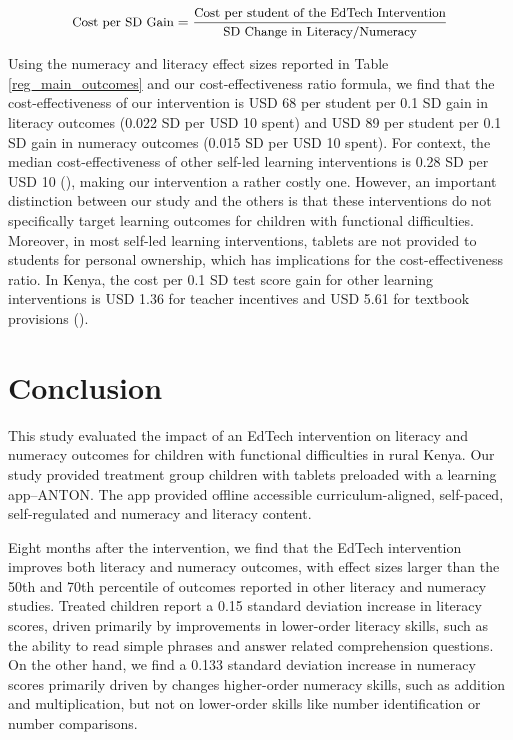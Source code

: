 \documentclass[hidelinks,12pt]{article}
\begin{document}
\begin{singlespace}
\[
\small\text{Cost per SD Gain} = \frac{\text{Cost per student of the EdTech Intervention}}{\text{SD Change in Literacy/Numeracy}}
\]
\vspace{1cm}

Using the numeracy and literacy effect sizes reported in Table \ref{reg_main_outcomes} and our cost-effectiveness ratio formula, we find that the cost-effectiveness of our intervention is USD 68 per student per 0.1 SD gain in literacy outcomes (0.022 SD per USD 10 spent) and USD 89 per student per 0.1 SD gain in numeracy outcomes (0.015 SD per USD 10 spent). For context, the median cost-effectiveness of other self-led learning interventions is 0.28 SD per USD 10 (\cite{rodriguez-segura_edtech_2022}), making our intervention a rather costly one. However, an important distinction between our study and the others is that these interventions do not specifically target learning outcomes for children with functional difficulties. Moreover, in most self-led learning interventions, tablets are not provided to students for personal ownership, which has implications for the cost-effectiveness ratio. In Kenya, the cost per 0.1 SD test score gain for other learning interventions is USD 1.36 for teacher incentives and USD 5.61 for textbook provisions (\cite{mcewan_cost-effectiveness_2012}). 

\section{Conclusion} \label{sec:conclusions} %
This study evaluated the impact of an EdTech intervention on literacy and numeracy outcomes for children with functional difficulties in rural Kenya. Our study provided treatment group children with tablets preloaded with a learning app–ANTON. The app provided offline accessible curriculum-aligned, self-paced, self-regulated and numeracy and literacy content. 

Eight months after the intervention, we find that the EdTech intervention improves both literacy and numeracy outcomes, with effect sizes larger than the 50th  and 70th percentile of outcomes reported in other literacy and numeracy studies. Treated children report a 0.15 standard deviation increase in literacy scores, driven primarily by improvements in lower-order literacy skills, such as the ability to read simple phrases and answer related comprehension questions. On the other hand, we find a 0.133 standard deviation increase in numeracy scores primarily driven by changes higher-order numeracy skills, such as addition and multiplication, but not on lower-order skills like number identification or number comparisons.


\end{singlespace}
\end{document}
